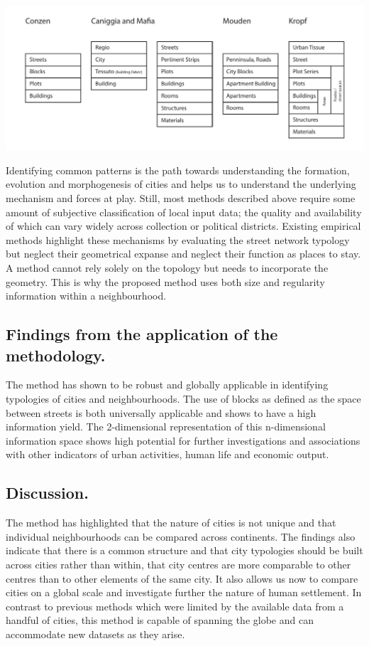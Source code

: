 \documentclass{nature}
\makeatletter
\renewenvironment*{figure}{\@float{figure}}{\end@float}
\makeatother
\begin{document}
\begin{figure}
\centering    
\includegraphics[scale=0.80,page=1]{Images/Typology_Dichtomies.pdf}  
\caption{\bf Different scales of dichotomies. }    
 \label{fig:TypologyDichtomies}  
\end{figure} 

Identifying common patterns is the path towards understanding the formation, evolution and morphogenesis of cities and helps us to understand the underlying mechanism and forces at play. Still, most methods described above require some amount of subjective classification of local input data; the quality and availability of which can vary widely across collection or political districts. Existing empirical methods highlight these mechanisms by evaluating the street network typology\cite{Hillier1989} but neglect their geometrical expanse and neglect their function as places to stay.  A method cannot rely solely on the topology but needs to incorporate the geometry\cite{Louf2014a}. This is why the proposed method uses both size and regularity information within a neighbourhood.  


\subsection{Findings from the application of the methodology.}
The method has shown to be robust and globally applicable in identifying typologies of cities and neighbourhoods. The use of blocks as defined as the space between streets is both universally applicable and shows to have a high information yield. The 2-dimensional representation of this n-dimensional information space shows high potential for further investigations and associations with other indicators of urban activities, human life and economic output.

\subsection{Discussion.}
The method has highlighted that the nature of cities is not unique and that individual neighbourhoods can be compared across continents. The findings also indicate that there is a common structure and that city typologies should be built across cities rather than within, that city centres are more comparable to other centres than to other elements of the same city.
It also allows us now to compare cities on a global scale and investigate further the nature of human settlement. In contrast to previous methods which were limited by the available data from a handful of cities, this method is capable of spanning the globe and can accommodate new datasets as they arise.  
\end{document}

